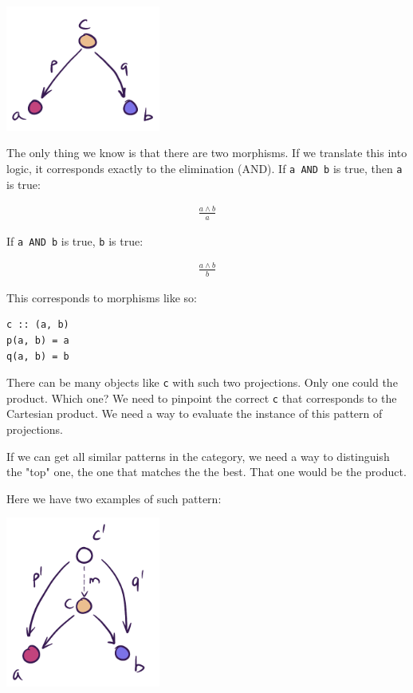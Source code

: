 \documentclass[11pt]{article}
\begin{document}
\begin{center}
\includegraphics[width=2.0in]{./img/product.png}
\end{center}

The only thing we know is that there are two morphisms. If we translate this into logic, it corresponds exactly to the elimination (AND). If \texttt{a AND b} is true, then \texttt{a} is true:

\begin{eqnarray}
\frac{a \wedge b}{a}
\end{eqnarray}

If \texttt{a AND b} is true, \texttt{b} is true:

\begin{eqnarray}
\frac{a \wedge b}{b}
\end{eqnarray}

This corresponds to morphisms like so:

\begin{verbatim}
c :: (a, b)
p(a, b) = a
q(a, b) = b
\end{verbatim}

There can be many objects like \texttt{c} with such two projections. Only one could the product. Which one? We need to pinpoint the correct \texttt{c} that corresponds to the Cartesian product. We need a way to evaluate the instance of this pattern of projections.

If we can get all similar patterns in the category, we need a way to distinguish the "top" one, the one that matches the the best. That one would be the product.

Here we have two examples of such pattern:

\begin{center}
\includegraphics[width=2.0in]{./img/candidate.png}
\end{center}
\end{document}
